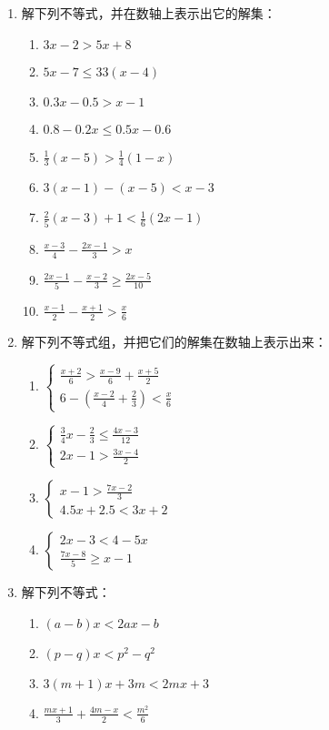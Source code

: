 \begin{ex}
\begin{enumerate}
    \item  解下列不等式，并在数轴上表示出它的解集：
    \begin{multicols}{2}
\begin{enumerate}
\item $3 x-2>5 x+8$
\item $5 x-7 \le 33(x-4)$
\item  $0.3 x-0.5>x-1$
\item $0.8-0.2 x \le 0.5 x-0.6$
\item $\frac{1}{3}(x-5)>\frac{1}{4}(1-x)$
\item  $3(x-1)-(x-5)<x-3$
\item $\frac{2}{5}(x-3)+1<\frac{1}{6}(2 x-1) $
\item $\frac{x-3}{4}-\frac{2 x-1}{3}>x$
\item $\frac{2 x-1}{5}-\frac{x-2}{3} \geq \frac{2 x-5}{10}$
\item $\frac{x-1}{2}-\frac{x+1}{2}>\frac{x}{6}$
\end{enumerate}       
    \end{multicols}

\item 解下列不等式组，并把它们的解集在数轴上表示出来：
\begin{multicols}{2}
\begin{enumerate}
\item $\begin{cases}
    \frac{x+2}{6}>\frac{x-9}{6}+\frac{x+5}{2}\\
    6-\left(\frac{x-2}{4}+\frac{2}{3}\right)<\frac{x}{6}
\end{cases}$
\item $\begin{cases}
    \frac{3}{4}x-\frac{2}{3}\le \frac{4x-3}{12}\\
    2x-1>\frac{3x-4}{2}
\end{cases}$
\item $\begin{cases}
    x-1>\frac{7x-2}{3}\\
    4.5x+2.5<3x+2
\end{cases}$
\item $\begin{cases}
2x-3<4-5x\\
\frac{7x-8}{5}\ge x-1    
\end{cases}$
\end{enumerate}
\end{multicols}

\item 解下列不等式：
\begin{multicols}{2}
\begin{enumerate}
    \item $(a-b)x<2ax-b$
    \item $(p-q)x<p^2-q^2$
    \item $3(m+1)x+3m<2mx+3$
    \item $\frac{mx+1}{3}+\frac{4m-x}{2}<\frac{m^2}{6}$
\end{enumerate}
\end{multicols}
\end{enumerate}
\end{ex}    

